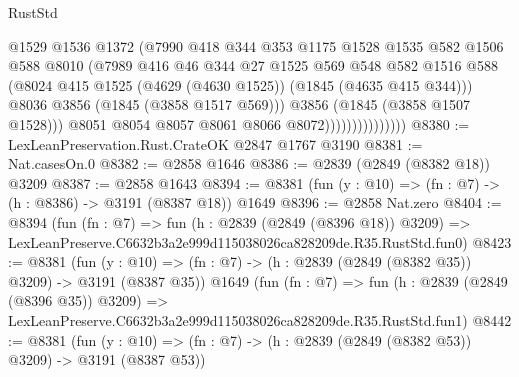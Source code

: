 \begin{lexlean}{RustStd}
\begin{coremodule}
                                  @1529
                                  @1536
                                  @1372
                                  (@7990
                                    @418
                                    @344
                                    @353
                                    @1175
                                    @1528
                                    @1535
                                    @582
                                    @1506
                                    @588
                                    @8010
                                    (@7989
                                      @416
                                      @46
                                      @344
                                      @27
                                      @1525
                                      @569
                                      @548
                                      @582
                                      @1516
                                      @588
                                      (@8024
                                        @415
                                        @1525
                                        (@4629 (@4630 @1525))
                                        (@1845 (@4635 @415 @344)))
                                      @8036
                                      @3856
                                      (@1845 (@3858 @1517 @569)))
                                    @3856
                                    (@1845 (@3858 @1507 @1528)))
                                  @8051
                                  @8054
                                  @8057
                                  @8061
                                  @8066
                                  @8072)))))))))))))))
@8380 := LexLeanPreservation.Rust.CrateOK @2847 @1767 @3190
@8381 := Nat.casesOn.{0}
@8382 := @2858 @1646
@8386 := @2839 (@2849 (@8382 @18)) @3209
@8387 := @2858 @1643
@8394 := @8381 (fun (y : @10) => (fn : @7) -> (h : @8386) -> @3191 (@8387 @18)) @1649
@8396 := @2858 Nat.zero
@8404 := @8394
    (fun (fn : @7) =>
    fun (h : @2839 (@2849 (@8396 @18)) @3209) =>
    LexLeanPreserve.C6632b3a2e999d115038026ca828209de.R35.RustStd.fun0)
@8423 := @8381
    (fun (y : @10) => (fn : @7) -> (h : @2839 (@2849 (@8382 @35)) @3209) -> @3191 (@8387 @35))
    @1649
    (fun (fn : @7) =>
    fun (h : @2839 (@2849 (@8396 @35)) @3209) =>
    LexLeanPreserve.C6632b3a2e999d115038026ca828209de.R35.RustStd.fun1)
@8442 := @8381
    (fun (y : @10) => (fn : @7) -> (h : @2839 (@2849 (@8382 @53)) @3209) -> @3191 (@8387 @53))

\end{coremodule}
\end{lexlean}

